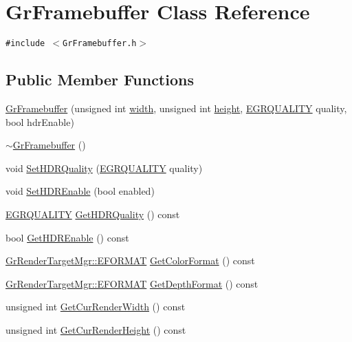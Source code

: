 \hypertarget{class_gr_framebuffer}{
\section{GrFramebuffer Class Reference}
\label{class_gr_framebuffer}
}
{\tt \#include $<$GrFramebuffer.h$>$}

\subsection*{Public Member Functions}
\begin{CompactItemize}
\item 
\hyperlink{class_gr_framebuffer_0433e1f6eb5632194138e0ce4749d9f0}{GrFramebuffer} (unsigned int \hyperlink{wglext_8h_e6531b1788ca42a9ae8155b0c52e7630}{width}, unsigned int \hyperlink{wglext_8h_b2e63df950c3789599e1e43f477bc9e3}{height}, \hyperlink{enums_8h_697c1ee1354746841860d5bf9f81c033}{EGRQUALITY} quality, bool hdrEnable)
\item 
\hyperlink{class_gr_framebuffer_e94e0323428385049cc79200fb15a6b0}{$\sim$GrFramebuffer} ()
\item 
void \hyperlink{class_gr_framebuffer_68bc3b696f651f9c4a24834fc0f8c5ea}{SetHDRQuality} (\hyperlink{enums_8h_697c1ee1354746841860d5bf9f81c033}{EGRQUALITY} quality)
\item 
void \hyperlink{class_gr_framebuffer_8977d79d6a403f383c9fb98966366aa4}{SetHDREnable} (bool enabled)
\item 
\hyperlink{enums_8h_697c1ee1354746841860d5bf9f81c033}{EGRQUALITY} \hyperlink{class_gr_framebuffer_d139490101238ff1b4ab0f7e573da734}{GetHDRQuality} () const 
\item 
bool \hyperlink{class_gr_framebuffer_6e6bc83db539cd14a8bb7128e9416b46}{GetHDREnable} () const 
\item 
\hyperlink{class_gr_render_target_mgr_66d0ebb49e9781283d824f19f4bbc3f6}{GrRenderTargetMgr::EFORMAT} \hyperlink{class_gr_framebuffer_28c6678e0d5bb83ea0ad0a6d1cf00a19}{GetColorFormat} () const 
\item 
\hyperlink{class_gr_render_target_mgr_66d0ebb49e9781283d824f19f4bbc3f6}{GrRenderTargetMgr::EFORMAT} \hyperlink{class_gr_framebuffer_fbeb94553e42babfc069cae3da658a38}{GetDepthFormat} () const 
\item 
unsigned int \hyperlink{class_gr_framebuffer_31437c5337b08fcb8c7677ab4cce01f3}{GetCurRenderWidth} () const 
\item 
unsigned int \hyperlink{class_gr_framebuffer_75e0ed08bb86b57d1168785c5005512c}{GetCurRenderHeight} () const 

\end{CompactItemize}
